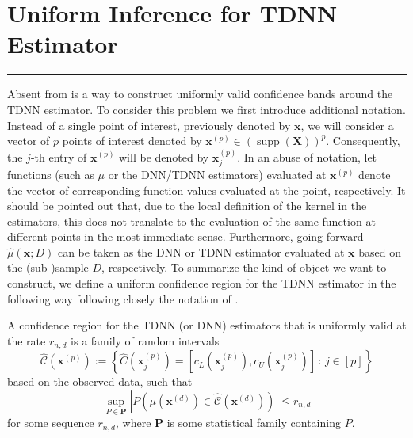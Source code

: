 \documentclass[letterpaper,10pt]{article}
\numberwithin{equation}{section}
\numberwithin{theorem}{section}
\theoremstyle{definition}
\renewcommand{\hat}{\widehat}
\newcommand{\1}{\mathbb{1}}
\begin{document}
\section{Uniform Inference for TDNN Estimator}\label{UnifInf}
\hrule
Absent from \citet{demirkaya_optimal_2024} is a way to construct uniformly valid confidence bands around the TDNN estimator.
To consider this problem we first introduce additional notation.
Instead of a single point of interest, previously denoted by $\mathbf{x}$, we will consider a vector of $p$ points of interest denoted by $\mathbf{x}^{(p)} \in \left(\operatorname{supp}\left(\mathbf{X}\right)\right)^{p}$.
Consequently, the $j$-th entry of $\mathbf{x}^{(p)}$ will be denoted by $\mathbf{x}^{(p)}_{j}$.
In an abuse of notation, let functions (such as $\mu$ or the DNN/TDNN estimators) evaluated at $\mathbf{x}^{(p)}$ denote the vector of corresponding function values evaluated at the point, respectively.
It should be pointed out that, due to the local definition of the kernel in the estimators, this does not translate to the evaluation of the same function at different points in the most immediate sense.
Furthermore, going forward $\hat{\mu}\left(\mathbf{x}; D\right)$ can be taken as the DNN or TDNN estimator evaluated at $\mathbf{x}$ based on the (sub-)sample $D$, respectively.
To summarize the kind of object we want to construct, we define a uniform confidence region for the TDNN estimator in the following way following closely the notation of \citet{ritzwoller_uniform_2024}.

\vspace{0.5cm}
\begin{definition}
	A confidence region for the TDNN (or DNN) estimators that is uniformly valid at the rate $r_{n,d}$ is a family of random intervals
	\begin{equation}
		\hat{\mathcal{C}}\left(\mathbf{x}^{(p)}\right)
		:= \left\{\hat{C}(\mathbf{x}^{(p)}_{j}) = \left[c_{L}(\mathbf{x}^{(p)}_{j}), c_{U}(\mathbf{x}^{(p)}_{j})\right]\, : \, j \in [p]\right\}
	\end{equation}
	based on the observed data, such that
	\begin{equation}
		\sup_{P \in \mathbf{P}} \left| P\left(\mu(\mathbf{x}^{(d)}) \in \hat{\mathcal{C}}\left(\mathbf{x}^{(d)}\right)\right) \right| \leq r_{n,d}
	\end{equation}
	for some sequence $r_{n,d}$, where $\mathbf{P}$ is some statistical family containing $P$.
\end{definition}
\end{document}
